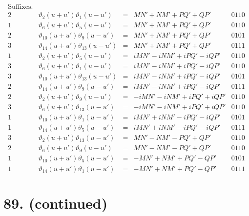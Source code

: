 \documentclass[11pt,a4paper]{article}
\newcommand{\uth}[1]{\vartheta_{#1}}
\begin{document}
\[
\begin{array}{ccccc}
\text{Suffixes.} & & & & \\
\hline
2 & \uth{2}(u+u')\uth{1}(u-u') &=& MN' + NM' + PQ' + QP' & 0110 \\
1 & \uth{6}(u+u')\uth{5}(u-u') &=& MN' + NM' + PQ' + QP' & 0110 \\
2 & \uth{10}(u+u')\uth{9}(u-u') &=& MN' + NM' + PQ' + QP' & 0101 \\
3 & \uth{14}(u+u')\uth{13}(u-u') &=& MN' + NM' + PQ' + QP' & 0111 \\
\hline
1 & \uth{2}(u+u')\uth{5}(u-u') &=& iMN' - iNM' + iPQ' - iQP' & 0110 \\
3 & \uth{6}(u+u')\uth{1}(u-u') &=& iMN' - iNM' + iPQ' - iQP' & 0110 \\
3 & \uth{10}(u+u')\uth{13}(u-u') &=& iMN' - iNM' + iPQ' - iQP' & 0101 \\
2 & \uth{14}(u+u')\uth{9}(u-u') &=& iMN' - iNM' + iPQ' - iQP' & 0111 \\
\hline
2 & \uth{2}(u+u')\uth{9}(u-u') &=& -iMN' - iNM' + iPQ' + iQP' & 0110 \\
3 & \uth{6}(u+u')\uth{13}(u-u') &=& -iMN' - iNM' + iPQ' + iQP' & 0110 \\
1 & \uth{10}(u+u')\uth{1}(u-u') &=& iMN' + iNM' - iPQ' - iQP' & 0101 \\
1 & \uth{14}(u+u')\uth{5}(u-u') &=& iMN' + iNM' - iPQ' - iQP' & 0111 \\
\hline
3 & \uth{2}(u+u')\uth{13}(u-u') &=& MN' - NM' - PQ' + QP' & 0110 \\
2 & \uth{6}(u+u')\uth{9}(u-u') &=& MN' - NM' - PQ' + QP' & 0110 \\
1 & \uth{10}(u+u')\uth{5}(u-u') &=& -MN' + NM' + PQ' - QP' & 0101 \\
1 & \uth{14}(u+u')\uth{1}(u-u') &=& -MN' + NM' + PQ' - QP' & 0111
\end{array}
\]

\newpage
\section*{89. (continued)}
\label{sec:89cont2}
\end{document}
